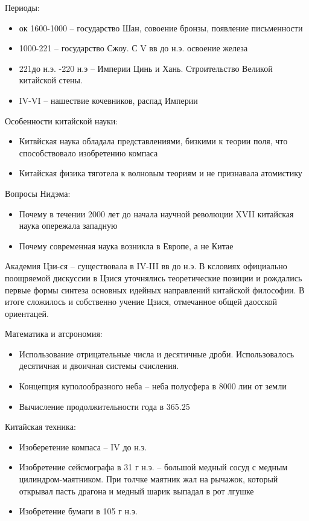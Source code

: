 \documentclass{book}
\theoremstyle{definition}
\begin{document}
   Периоды:
   \begin{itemize}
       \item ок 1600-1000 -- государство Шан, совоение бронзы, появление письменности
       \item 1000-221 -- государство Сжоу. С V вв до н.э. освоение железа
       \item 221до н.э. -220 н.э -- Империи Цинь и Хань. Строительство Великой китайской стены.
       \item IV-VI -- нашествие кочевников, распад Империи
   \end{itemize}

   Особенности китайской науки:
   \begin{itemize}
       \item  Китвйская наука обладала представлениями, бизкими к теории поля, что способствовало изобретению компаса
       \item Китайская физика тяготела к волновым теориям и не признавала атомистику
   \end{itemize}

   Вопросы Нидэма:
   \begin{itemize}
       \item  Почему в течении 2000 лет до начала научной революции XVII китайская наука опережала западную
       \item Почему современная наука возникла в Европе, а не Китае
   \end{itemize}

   Академия Цзи-ся -- существовала в IV-III вв до н.э. В ксловиях официально поощряемой дискуссии в Цзися уточнялись теоретические позиции и рождались первые формы синтеза основных идейных направлений китайской философии. В итоге сложилось и собственно учение Цзися, отмечанное общей даосской ориентацей.
   
    Математика и атсрономия:
    \begin{itemize}
        \item Использование отрицательные числа и десятичные дроби. Использовалось десятичная и двоичная системы счисления. 
        \item Концепция куполообразного неба -- неба полусфера в 8000 лин от земли
        \item Вычисление продолжительности года в 365.25
    \end{itemize}

    Китайская техника:
    \begin{itemize}
        \item Изоберетение компаса -- IV до н.э.
        \item Изобретение сейсмографа в 31 г н.э. -- большой медный сосуд с медным цилиндром-маятником. При толчке маятник жал на рычажок, который открывал пасть драгона и медный шарик выпадал в рот лгушке
        \item Изобретение бумаги в 105 г н.э.
    \end{itemize}
\end{document}
